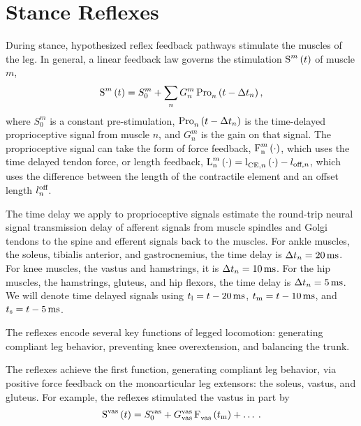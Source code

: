 \section{Stance Reflexes}\label{sec:neuro_stance_reflexes}

During stance, hypothesized reflex feedback pathways stimulate the muscles of
the leg. In general, a linear feedback law governs the stimulation
$\func{S}[][m]{t}$ of muscle $m$, 
\begin{align}
    \func{S}[][m]{t} = S_0^m + \sum_n G_n^m \func{Pro}[n][]{t - \Delta t_n},
\end{align}
where $S_0^m$ is a constant pre-stimulation, $\func{Pro}[n][]{t - \Delta t_n}$
is the time-delayed proprioceptive signal from muscle $n$, and $G_n^m$ is the
gain on that signal. The proprioceptive signal can take the form of force
feedback, $\func{F}[\tn{n}][m]{\cdot}$, which uses the time delayed tendon
force, or length feedback, $\func{L}[\tn{n}][m]{\cdot} =
\func{l}[\tn{CE},n][]{\cdot} - l_{\tn{off}, n}$, which uses the difference
between the length of the contractile element and an offset length
$l_n^{\textnormal{off}}$.

The time delay we apply to proprioceptive signals estimate the round-trip neural
signal transmission delay of afferent signals from muscle spindles and Golgi
tendons to the spine and efferent signals back to the muscles. For ankle
muscles, the soleus, tibialis anterior, and gastrocnemius, the time delay is
$\Delta t_n = \unit[20]{ms}$. For knee muscles, the vastus and hamstrings, it is
$\Delta t_n = \unit[10]{ms}$. For the hip muscles, the hamstrings, gluteus, and
hip flexors, the time delay is $\Delta t_n = \unit[5]{ms}$. We will denote time
delayed signals using $t_\tn{l} = t - \unit[20]{ms}$, $t_\tn{m} = t -
\unit[10]{ms}$, and $t_\tn{s} = t - \unit[5]{ms}$.


The reflexes encode several key functions of legged locomotion: generating
compliant leg behavior, preventing knee overextension, and balancing the trunk.

The reflexes achieve the first function, generating compliant leg behavior, via
positive force feedback on the monoarticular leg extensors: the soleus, vastus,
and gluteus. For example, the reflexes stimulated the vastus in part by
\begin{align}
    \func{S}[][\tn{vas}]{t} = S_0^\tn{vas} + 
        G_\tn{vas}^\tn{vas} \func{F}[\tn{vas}][]{t_\tn{m}} + \ldots \:.
\end{align}

